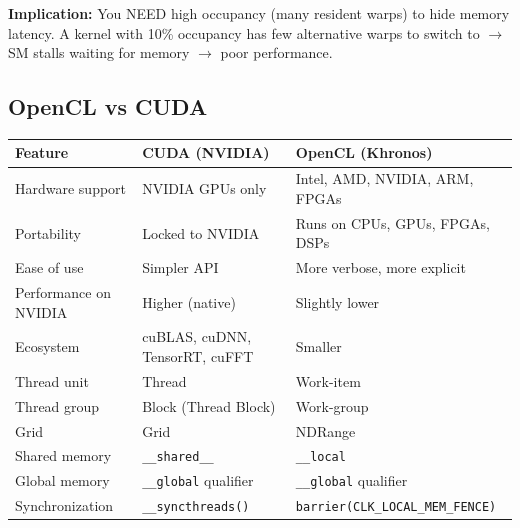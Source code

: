 \documentclass[11pt,a4paper]{article}
\newcommand{\code}[1]{\texttt{\small\colorbox{codebg}{\color{codekw}#1}}}
\begin{document}
\textbf{Implication:} You NEED high occupancy (many resident warps) to hide memory latency. A kernel with 10\% occupancy has few alternative warps to switch to $\to$ SM stalls waiting for memory $\to$ poor performance.

\subsection{OpenCL vs CUDA}

\begin{center}
\begin{tabularx}{\linewidth}{L{4.5cm} X X}
\toprule
\textbf{Feature} & \textbf{CUDA (NVIDIA)} & \textbf{OpenCL (Khronos)} \\
\midrule
Hardware support & NVIDIA GPUs only & Intel, AMD, NVIDIA, ARM, FPGAs \\
Portability & Locked to NVIDIA & Runs on CPUs, GPUs, FPGAs, DSPs \\
Ease of use & Simpler API & More verbose, more explicit \\
Performance on NVIDIA & Higher (native) & Slightly lower \\
Ecosystem & cuBLAS, cuDNN, TensorRT, cuFFT & Smaller \\
Thread unit & Thread & Work-item \\
Thread group & Block (Thread Block) & Work-group \\
Grid & Grid & NDRange \\
Shared memory & \code{\_\_shared\_\_} & \code{\_\_local} \\
Global memory & \code{\_\_global} qualifier & \code{\_\_global} qualifier \\
Synchronization & \code{\_\_syncthreads()} & \code{barrier(CLK\_LOCAL\_MEM\_FENCE)} \\
\bottomrule
\end{tabularx}
\end{center}
\end{document}

